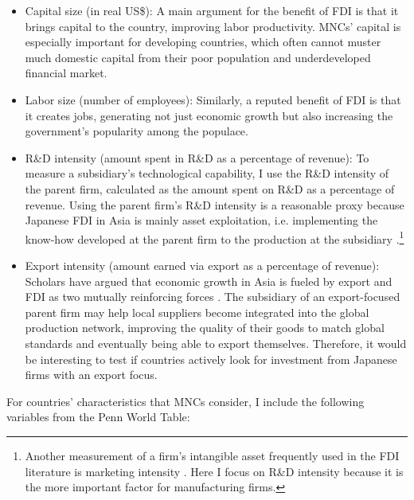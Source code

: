 \begin{itemize}
\item Capital size (in real US\$): A main argument for the benefit of FDI is
  that it brings capital to the country, improving labor productivity. MNCs'
  capital is especially important for developing countries, which often cannot
  muster much domestic capital from their poor population and underdeveloped
  financial market.

\item Labor size (number of employees): Similarly, a reputed benefit of FDI is
  that it creates jobs, generating not just economic growth but also increasing
  the government's popularity among the populace.

\item R\&D intensity (amount spent in R\&D as a percentage of revenue): To
  measure a subsidiary's technological capability, I use the R\&D intensity of
  the parent firm, calculated as the amount spent on R\&D as a percentage of
  revenue. Using the parent firm's R\&D intensity is a reasonable proxy because
  Japanese FDI in Asia is mainly asset exploitation, i.e. implementing the
  know-how developed at the parent firm to the production at the subsidiary
  \citep{Pak2005}.\footnote{Another measurement of a firm's intangible asset
    frequently used in the FDI literature is marketing intensity
    \citep{Girma2005}. Here I focus on R\&D intensity because it is the more
    important factor for manufacturing firms.}

\item Export intensity (amount earned via export as a percentage of revenue):
  Scholars have argued that economic growth in Asia is fueled by export and FDI
  as two mutually reinforcing forces \citep{Liu2002}. The subsidiary of an
  export-focused parent firm may help local suppliers become integrated into
  the global production network, improving the quality of their goods to match
  global standards and eventually being able to export themselves. Therefore, it
  would be interesting to test if countries actively look for investment from
  Japanese firms with an export focus.
\end{itemize}

For countries' characteristics that MNCs consider, I include the following
variables from the Penn World Table:

